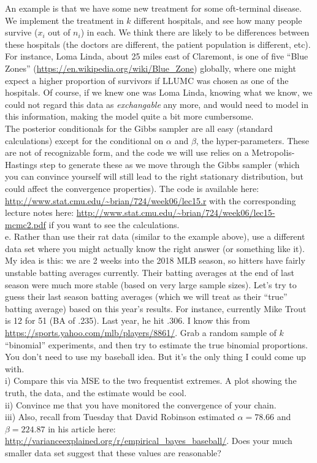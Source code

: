 \documentclass{article}
\begin{document}
An example is that we have some new treatment for some oft-terminal disease.  We implement the treatment in $k$ different hospitals, and see how many people survive ($x_i$ out of $n_i$) in each.   We think there are likely to be differences between these hospitals (the doctors are different, the patient population is different, etc).  For instance, Loma Linda, about 25 miles east of Claremont, is one of five  ``Blue Zones'' (\url{https://en.wikipedia.org/wiki/Blue_Zone}) globally, where one might expect a higher proportion of survivors if LLUMC was chosen as one of the hospitals.  Of course, if we knew one was Loma Linda, knowing what we know, we could not regard this data as {\it exchangable} any more, and would need to model in this information, making the model quite a bit more cumbersome.\\

The posterior conditionals for the Gibbs sampler are all easy (standard calculations) except for the conditional on $\alpha$ and $\beta$, the hyper-parameters.  These are not of recognizable form, and the code we will use relies on a Metropolis-Hastings step to generate these as we move through the Gibbs sampler (which you can convince yourself will still lead to the right stationary distribution, but could affect the convergence properties).  The code is available here: \url{http://www.stat.cmu.edu/~brian/724/week06/lec15.r} with the corresponding lecture notes here: \url{http://www.stat.cmu.edu/~brian/724/week06/lec15-mcmc2.pdf} if you want to see the calculations.\\[10pt]
e.  Rather than use their rat data (similar to the example above), use a different data set where you might actually know the right answer (or something like it).  My idea is this: we are 2 weeks into the 2018 MLB season, so hitters have fairly unstable batting averages currently.  Their batting averages at the end of last season were much more stable (based on very large sample sizes).  Let's try to guess their last season batting averages (which we will treat as their ``true'' batting average) based on this year's results. For instance, currently Mike Trout is 12 for 51 (BA of .235).  Last year, he hit .306.  I know this from \url{https://sports.yahoo.com/mlb/players/8861/}.  Grab a random sample of $k$ ``binomial'' experiments, and then try to estimate the true binomial proportions. You don't need to use my baseball idea.  But it's the only thing I could come up with. \\[5pt]  
i) Compare this via MSE to the two frequentist extremes. A plot showing the truth, the data, and the estimate would be cool.\\[2pt]  
ii) Convince me that you have monitored the convergence of your chain.\\[2pt]  
iii) Also, recall from Tuesday that David Robinson estimated $\alpha=78.66$ and $\beta=224.87$ in his article here: \url{http://varianceexplained.org/r/empirical_bayes_baseball/}.  Does your much smaller data set suggest that these values are reasonable?\\
\end{document}

